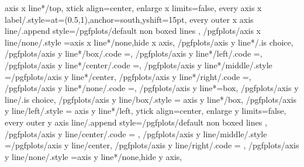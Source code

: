 {{{			axis x line*/top,
			xtick align=center,
			enlarge x limits=false,
			every axis x label/.style={at={(0.5,1)},anchor=south,yshift=15pt},
			every outer x axis line/.append style={/pgfplots/default non boxed lines}}%
		\ifnum{} %
		\fi
	},
	/pgfplots/axis x line/none/.style	={axis x line*/none,hide x axis},
	/pgfplots/axis y line*/.is choice,
	/pgfplots/axis y line*/box/.code	={\def\pgfplots@yaxislinesnum{0}\def\pgfplots@ytickposnum{0}},
	/pgfplots/axis y line*/left/.code	={\def\pgfplots@yaxislinesnum{1}\def\pgfplots@ytickposnum{1}},
	/pgfplots/axis y line*/center/.code	={\def\pgfplots@yaxislinesnum{2}\def\pgfplots@ytickposnum{2}},
	/pgfplots/axis y line*/middle/.style	={/pgfplots/axis y line*/center},
	/pgfplots/axis y line*/right/.code	={\def\pgfplots@yaxislinesnum{3}\def\pgfplots@ytickposnum{3}},
	/pgfplots/axis y line*/none/.code	={\def\pgfplots@yaxislinesnum{4}\def\pgfplots@ytickposnum{4}},
	/pgfplots/axis y line*=box,
	/pgfplots/axis y line/.is choice,
	/pgfplots/axis y line/box/.style	={
		axis y line*/box},
	/pgfplots/axis y line/left/.style	={
		axis y line*/left,
		ytick align=center,
		enlarge y limits=false,
		every outer y axis line/.append style={/pgfplots/default non boxed lines}
	},
	/pgfplots/axis y line/center/.code	={
		\ifnum{} %
		\else
		\fi
	},
	/pgfplots/axis y line/middle/.style	={/pgfplots/axis y line/center},
	/pgfplots/axis y line/right/.code	={%
		\ifnum{}
		\fi
	},%
	/pgfplots/axis y line/none/.style	={axis y line*/none,hide y axis},
}

